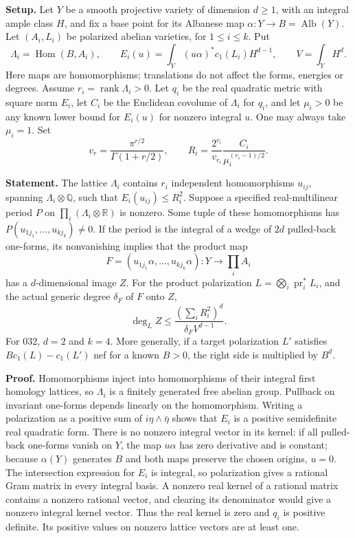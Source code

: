 \documentclass[11pt,a4paper]{article}
\theoremstyle{definition}
\begin{document}
\textbf{Setup.} Let \(Y\) be a smooth projective variety of dimension \(d\ge1\), with an integral ample class \(H\), and fix a base point for its Albanese map \(\alpha:Y\to B=\operatorname{Alb}(Y)\). Let \((A_i,L_i)\) be polarized abelian varieties, for \(1\le i\le k\). Put \[
 \Lambda_i=\operatorname{Hom}(B,A_i),\qquad
 E_i(u)=\int_Y (u\alpha)^*c_1(L_i)H^{d-1},\qquad
 V=\int_YH^d.
\] Here maps are homomorphisms; translations do not affect the forms, energies or degrees. Assume \(r_i=\operatorname{rank}\Lambda_i>0\). Let \(q_i\) be the real quadratic metric with square norm \(E_i\), let \(C_i\) be the Euclidean covolume of \(\Lambda_i\) for \(q_i\), and let \(\mu_i>0\) be any known lower bound for \(E_i(u)\) for nonzero integral \(u\). One may always take \(\mu_i=1\). Set \[
 v_r=\frac{\pi^{r/2}}{\Gamma(1+r/2)},\qquad
 R_i=\frac{2^{r_i}}{v_{r_i}}\frac{C_i}{\mu_i^{(r_i-1)/2}}.
\]

\textbf{Statement.} The lattice \(\Lambda_i\) contains \(r_i\) independent homomorphisms \(u_{ij}\), spanning \(\Lambda_i\otimes\mathbb Q\), such that \(E_i(u_{ij})\le R_i^2\). Suppose a specified real-multilinear period \(P\) on \(\prod_i(\Lambda_i\otimes\mathbb R)\) is nonzero. Some tuple of these homomorphisms has \(P(u_{1j_1},\ldots,u_{kj_k})\ne0\). If the period is the integral of a wedge of \(2d\) pulled-back one-forms, its nonvanishing implies that the product map \[
 F=(u_{1j_1}\alpha,\ldots,u_{kj_k}\alpha):Y\longrightarrow\prod_i A_i
\] has a \(d\)-dimensional image \(Z\). For the product polarization \(L=\bigotimes_i\operatorname{pr}_i^*L_i\), and the actual generic degree \(\delta_F\) of \(F\) onto \(Z\), \[
 \deg_L Z\le\frac{(\sum_iR_i^2)^d}{\delta_F V^{d-1}}.
\tag{B10.1}
\] For 032, \(d=2\) and \(k=4\). More generally, if a target polarization \(L'\) satisfies \(B c_1(L)-c_1(L')\) nef for a known \(B>0\), the right side is multiplied by \(B^d\).

\textbf{Proof.} Homomorphisms inject into homomorphisms of their integral first homology lattices, so \(\Lambda_i\) is a finitely generated free abelian group. Pullback on invariant one-forms depends linearly on the homomorphism. Writing a polarization as a positive sum of \(i\eta\wedge\bar\eta\) shows that \(E_i\) is a positive semidefinite real quadratic form. There is no nonzero integral vector in its kernel: if all pulled-back one-forms vanish on \(Y\), the map \(u\alpha\) has zero derivative and is constant; because \(\alpha(Y)\) generates \(B\) and both maps preserve the chosen origins, \(u=0\). The intersection expression for \(E_i\) is integral, so polarization gives a rational Gram matrix in every integral basis. A nonzero real kernel of a rational matrix contains a nonzero rational vector, and clearing its denominator would give a nonzero integral kernel vector. Thus the real kernel is zero and \(q_i\) is positive definite. Its positive values on nonzero lattice vectors are at least one.
\end{document}
